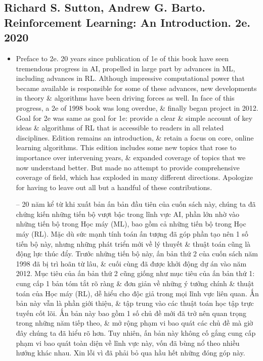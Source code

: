 \documentclass{article}
\begin{document}

\subsection{{\sc Richard S. Sutton, Andrew G. Barto}. Reinforcement Learning: An Introduction. 2e. 2020}

\begin{itemize}
    \item {\sf Preface to 2e.} 20 years since publication of 1e of this book have seen tremendous progress in AI, propelled in large part by advances in ML, including advances in RL. Although impressive computational power that became available is responsible for some of these advances, new developments in theory \& algorithms have been driving forces as well. In face of this progress, a 2e of 1998 book was long overdue, \& finally began project in 2012. Goal for 2e was same as goal for 1e: provide a clear \& simple account of key ideas \& algorithms of RL that is accessible to readers in all related disciplines. Edition remains an introduction, \& retain a focus on core, online learning algorithms. This edition includes some new topics that rose to importance over intervening years, \& expanded coverage of topics that we now understand better. But made no attempt to provide comprehensive coverage of field, which has exploded in many different directions. Apologize for having to leave out all but a handful of these contributions.

    -- 20 năm kể từ khi xuất bản ấn bản đầu tiên của cuốn sách này, chúng ta đã chứng kiến những tiến bộ vượt bậc trong lĩnh vực AI, phần lớn nhờ vào những tiến bộ trong Học máy (ML), bao gồm cả những tiến bộ trong Học máy (RL). Mặc dù sức mạnh tính toán ấn tượng đã góp phần tạo nên 1 số tiến bộ này, nhưng những phát triển mới về lý thuyết \& thuật toán cũng là động lực thúc đẩy. Trước những tiến bộ này, ấn bản thứ 2 của cuốn sách năm 1998 đã bị trì hoãn từ lâu, \& cuối cùng đã được khởi động dự án vào năm 2012. Mục tiêu của ấn bản thứ 2 cũng giống như mục tiêu của ấn bản thứ 1: cung cấp 1 bản tóm tắt rõ ràng \& đơn giản về những ý tưởng chính \& thuật toán của Học máy (RL), dễ hiểu cho độc giả trong mọi lĩnh vực liên quan. Ấn bản này vẫn là phần giới thiệu, \& tập trung vào các thuật toán học tập trực tuyến cốt lõi. Ấn bản này bao gồm 1 số chủ đề mới đã trở nên quan trọng trong những năm tiếp theo, \& mở rộng phạm vi bao quát các chủ đề mà giờ đây chúng ta đã hiểu rõ hơn. Tuy nhiên, ấn bản này không cố gắng cung cấp phạm vi bao quát toàn diện về lĩnh vực này, vốn đã bùng nổ theo nhiều hướng khác nhau. Xin lỗi vì đã phải bỏ qua hầu hết những đóng góp này.


\end{itemize}
\end{document}
